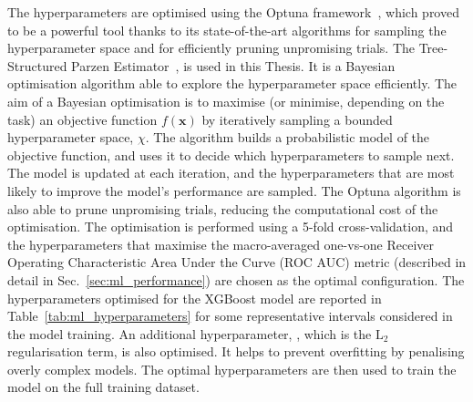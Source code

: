 The hyperparameters are optimised using the Optuna framework~\cite{akiba2019optuna}, which proved to be a powerful tool thanks to its state-of-the-art algorithms for sampling the hyperparameter space and for efficiently pruning unpromising trials. The Tree-Structured Parzen Estimator~\cite{bergstra2011algorithms}, is used in this Thesis. It is a Bayesian optimisation algorithm able to explore the hyperparameter space efficiently. The aim of a Bayesian optimisation is to maximise (or minimise, depending on the task) an objective function $f(\mathbf{x})$ by iteratively sampling a bounded hyperparameter space, $\chi$. The algorithm builds a probabilistic model of the objective function, and uses it to decide which hyperparameters to sample next. The model is updated at each iteration, and the hyperparameters that are most likely to improve the model's performance are sampled. The Optuna algorithm is also able to prune unpromising trials, reducing the computational cost of the optimisation. The optimisation is performed using a 5-fold cross-validation, and the hyperparameters that maximise the macro-averaged one-vs-one Receiver Operating Characteristic Area Under the Curve (ROC AUC) metric (described in detail in Sec.~\ref{sec:ml_performance}) are chosen as the optimal configuration. The hyperparameters optimised for the XGBoost model are reported in Table~\ref{tab:ml_hyperparameters} for some representative \pt intervals considered in the model training. An additional hyperparameter, , which is the $\mathrm{L_2}$ regularisation term, is also optimised. It helps to prevent overfitting by penalising overly complex models. The optimal hyperparameters are then used to train the model on the full training dataset.

